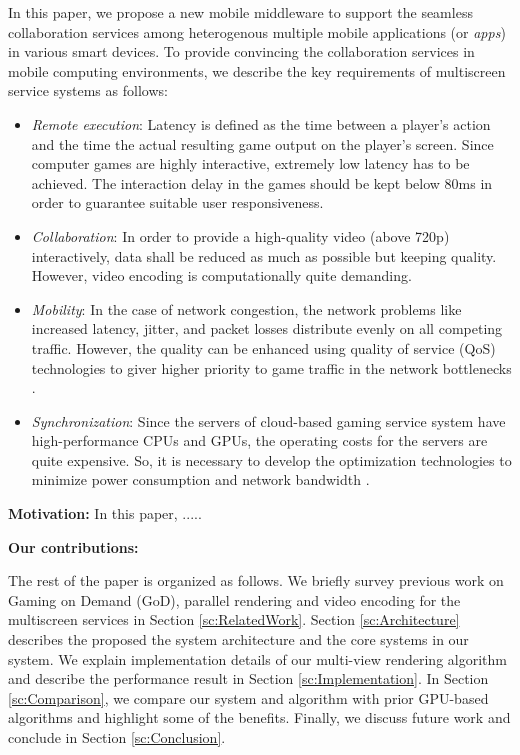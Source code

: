 \documentclass{sig-alternate}
\newcommand{\bi}{\begin{itemize}}
\newcommand{\ei}{\end{itemize}}
\newcommand{\ii}{\item}
\begin{document}
 In this paper, we propose a new mobile middleware to support the seamless collaboration services among heterogenous multiple mobile applications (or \textit{apps}) in various smart devices.
    To provide convincing the collaboration services in mobile computing environments, we describe the key requirements of multiscreen service systems as follows:
    \bi
    \ii \emph{Remote execution}: 
Latency is defined as the time between a player's action and the time the actual resulting game output on the player's screen. Since computer games are highly interactive, extremely low latency has to be achieved.
    The interaction delay in the games should be kept below 80ms in order to guarantee suitable user responsiveness.
    \ii \emph{Collaboration}: 
In order to provide a high-quality video (above 720p) interactively, data shall be reduced as much as possible but keeping quality. However, video encoding is computationally quite demanding.
    \ii \emph{Mobility}: 
In the case of network congestion, the network problems like increased latency, jitter, and packet losses distribute evenly on all competing traffic. However, the quality can be enhanced using quality of service (QoS) technologies to giver higher priority to game traffic in the network bottlenecks \cite{Jurgelionis:2010}.
    \ii \emph{Synchronization}: 
Since the servers of cloud-based gaming service system have high-performance CPUs and GPUs, the operating costs for the servers are quite expensive. So, it is necessary to develop the optimization technologies to minimize power consumption and network bandwidth \cite{Perlman:2009}.
\ei

\noindent
\textbf{Motivation:} In this paper, .....

\noindent
\textbf{Our contributions:}

The rest of the paper is organized as follows.
    We briefly survey previous work on Gaming on Demand (GoD), parallel rendering and video encoding for the multiscreen services in Section \ref{sc:RelatedWork}.
    Section \ref{sc:Architecture} describes the proposed the system architecture and the core systems in our system.
    We explain implementation details of our multi-view rendering algorithm and describe the performance result in Section \ref{sc:Implementation}.
    In Section \ref{sc:Comparison}, we compare our system and algorithm with prior GPU-based algorithms and highlight some of the benefits.
    Finally, we discuss future work and conclude in Section \ref{sc:Conclusion}.
\end{document}
